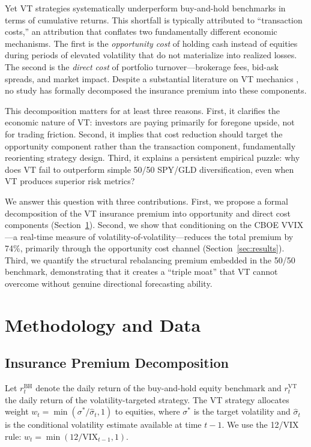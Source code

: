 \documentclass[12pt,a4paper]{article}
\begin{document}
Yet VT strategies systematically underperform buy-and-hold benchmarks in terms of cumulative returns. This shortfall is typically attributed to ``transaction costs,'' an attribution that conflates two fundamentally different economic mechanisms. The first is the \emph{opportunity cost} of holding cash instead of equities during periods of elevated volatility that do not materialize into realized losses. The second is the \emph{direct cost} of portfolio turnover---brokerage fees, bid-ask spreads, and market impact. Despite a substantial literature on VT mechanics \citep{moreira2017, barroso2015, cederburg2020}, no study has formally decomposed the insurance premium into these components.

This decomposition matters for at least three reasons. First, it clarifies the economic nature of VT: investors are paying primarily for foregone upside, not for trading friction. Second, it implies that cost reduction should target the opportunity component rather than the transaction component, fundamentally reorienting strategy design. Third, it explains a persistent empirical puzzle: why does VT fail to outperform simple 50/50 SPY/GLD diversification, even when VT produces superior risk metrics?

We answer this question with three contributions. First, we propose a formal decomposition of the VT insurance premium into opportunity and direct cost components (Section~\ref{sec:method}). Second, we show that conditioning on the CBOE VVIX---a real-time measure of volatility-of-volatility---reduces the total premium by 74\%, primarily through the opportunity cost channel (Section~\ref{sec:results}). Third, we quantify the structural rebalancing premium embedded in the 50/50 benchmark, demonstrating that it creates a ``triple moat'' that VT cannot overcome without genuine directional forecasting ability.

\section{Methodology and Data}
\label{sec:method}

\subsection{Insurance Premium Decomposition}
\label{sec:decomp}

Let $r_t^{\text{BH}}$ denote the daily return of the buy-and-hold equity benchmark and $r_t^{\text{VT}}$ the daily return of the volatility-targeted strategy. The VT strategy allocates weight $w_t = \min(\sigma^*/\hat{\sigma}_t, 1)$ to equities, where $\sigma^*$ is the target volatility and $\hat{\sigma}_t$ is the conditional volatility estimate available at time $t-1$. We use the 12/VIX rule: $w_t = \min(12/\text{VIX}_{t-1}, 1)$.
\end{document}
